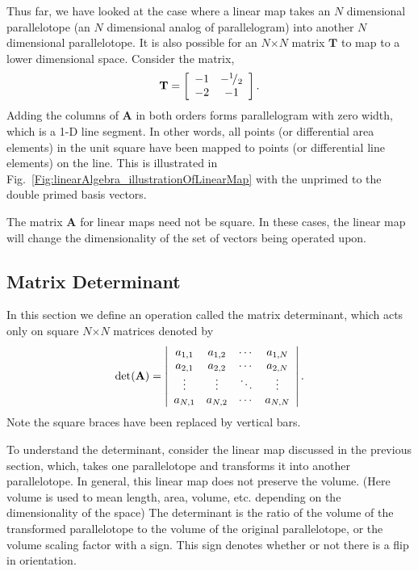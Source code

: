 Thus far, we have looked at the case where a linear map takes an $N$ dimensional parallelotope (an $N$ dimensional analog of parallelogram) into another $N$ dimensional parallelotope. It is also possible for an $N$$\times$$N$ matrix $\mathbf{T}$ to map to a lower dimensional space. Consider the matrix,
\begin{align}
  \mathbf{T} = 
  \left[ \begin{array}{c c} -1 & -{}^{1}\!/_{2} \\
  							-2 & -1 \\ \end{array} \right] . \nonumber 
\end{align}
Adding the columns of $\mathbf{A}$ in both orders forms parallelogram with zero width, which is a 1-D line segment. In other words, all points (or differential area elements) in the unit square have been mapped to points (or differential line elements) on the line. This is illustrated in Fig.~\ref{Fig:linearAlgebra_illustrationOfLinearMap} with the unprimed to the double primed basis vectors.

The matrix $\mathbf{A}$ for linear maps need not be square. In these cases, the linear map will change the dimensionality of the set of vectors being operated upon.


\subsection{Matrix Determinant} \label{Sec:linearAlgebra_Matrices_MatrixDeterminant}

In this section we define an operation called the matrix determinant, which acts only on square $N$$\times$$N$ matrices denoted by
\begin{align}
  \det{A} = 
  \left| \begin{array}{c c c c} a_{1,1} & a_{1,2} & \cdots & a_{1,N} \\
  								a_{2,1} & a_{2,2} & \cdots & a_{2,N} \\
								\vdots  & \vdots  & \ddots & \vdots  \\
								a_{N,1} & a_{N,2} & \cdots & a_{N,N} \\ \end{array} \right|.
\end{align}
Note the square braces have been replaced by vertical bars.

To understand the determinant, consider the linear map discussed in the previous section, which, takes one parallelotope and transforms it into another parallelotope. In general, this linear map does not preserve the volume. (Here volume is used to mean length, area, volume, etc. depending on the dimensionality of the space) The determinant is the ratio of the volume of the transformed parallelotope to the volume of the original parallelotope, or the volume scaling factor with a sign. This sign denotes whether or not there is a flip in orientation.

